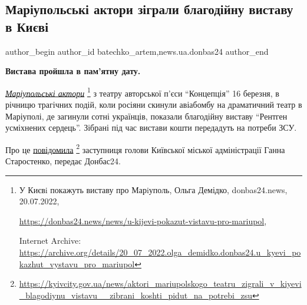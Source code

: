  
 
 
 
 
 
\subsection{Маріупольські актори зіграли благодійну виставу в Києві}
\label{sec:17_03_2023.stz.news.ua.donbas24.1.mrpl_aktory_zigraly_blagodijnu_vystavu_v_kyevi}
 
\ifcmt
 author_begin
   author_id batechko_artem,news.ua.donbas24
 author_end
\fi


\textbf{Вистава пройшла в пам'ятну дату.}

\href{https://archive.org/details/20_07_2022.olga_demidko.donbas24.u_kyevi_pokazhut_vystavu_pro_mariupol}{\emph{Маріупольські актори}}%
\footnote{У Києвi покажуть виставу про Марiуполь, Ольга Демідко, donbas24.news, 20.07.2022, %
\par\url{https://donbas24.news/news/u-kijevi-pokazut-vistavu-pro-mariupol}, \par%
Internet Archive: \url{https://archive.org/details/20_07_2022.olga_demidko.donbas24.u_kyevi_pokazhut_vystavu_pro_mariupol}%
} з театру авторської п'єси \enquote{Концепція} 16 березня, в
річницю трагічних подій, коли росіяни скинули авіабомбу на драматичний театр в
Маріуполі, де загинули сотні українців, показали благодійну виставу \enquote{Рентген
усміхнених сердець}. Зібрані під час вистави кошти передадуть на потреби ЗСУ.


Про це \href{https://kyivcity.gov.ua/news/aktori_mariupolskogo_teatru_zigrali_v_kiyevi_blagodiynu_vistavu__zibrani_koshti_pidut_na_potrebi_zsu}{повідомила}%
\footnote{\url{https://kyivcity.gov.ua/news/aktori_mariupolskogo_teatru_zigrali_v_kiyevi_blagodiynu_vistavu__zibrani_koshti_pidut_na_potrebi_zsu}} заступниця голови Київської міської адміністрації Ганна
Старостенко, передає Донбас24.

